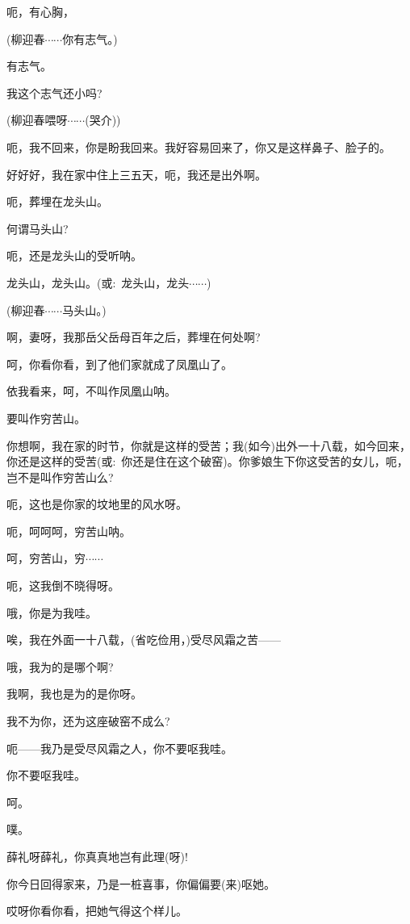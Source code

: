 {{呃，有心胸，

(柳迎春\hspace{20pt}$\cdots{}\cdots{}$你有志气。)

有志气。

我这个志气还小吗?

(柳迎春\hspace{20pt}喂呀$\cdots{}\cdots{}$({\hwfs 哭介}))

呃，我不回来，你是盼我回来。我好容易回来了，你又是这样鼻子、脸子的。

好好好，我在家中住上三五天，呃，我还是出外啊。

呃，葬埋在龙头山。

何谓马头山?

呃，还是龙头山的受听呐。

龙头山，龙头山。({\akai 或}:~龙头山，龙头$\cdots{}\cdots{}$)

(柳迎春\hspace{20pt}$\cdots{}\cdots{}$马头山。)

啊，妻呀，我那岳父岳母百年之后，葬埋在何处啊?

呵，你看你看，到了他们家就成了凤凰山了。

依我看来，呵，不叫作凤凰山呐。

要叫作穷苦山。

你想啊，我在家的时节，你就是这样的受苦；我(如今)出外一十八载，如今回来，你还是这样的受苦({\akai 或}:~你还是住在这个破窑)。你爹娘生下你这受苦的女儿，呃，岂不是叫作穷苦山么?

呃，这也是你家的坟地里的风水呀。

呃，呵呵呵，穷苦山呐。

呵，穷苦山，穷$\cdots{}\cdots{}$

呃，这我倒不晓得呀。

哦，你是为我哇。

唉，我在外面一十八载，(省吃俭用，)受尽风霜之苦------

哦，我为的是哪个啊?

我啊，我也是为的是你呀。

我不为你，还为这座破窑不成么?

呃------我乃是受尽风霜之人，你不要呕我哇。

你不要呕我哇。

呵。

噗。

薛礼呀薛礼，你真真地岂有此理(呀)!

你今日回得家来，乃是一桩喜事，你偏偏要(来)呕她。

哎呀你看你看，把她气得这个样儿。

}}
